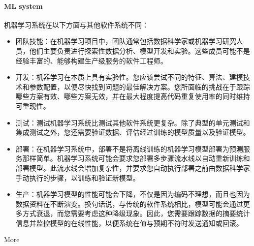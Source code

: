 \documentclass[letterpaper,11pt,english]{sphinxmanual}
\begin{document}
\paragraph{ML system}
\label{\detokenize{chapter_AI_dive/ML:ml-system}}
机器学习系统在以下方面与其他软件系统不同：%
\begin{footnote}[844]\sphinxAtStartFootnote
{}
%
\end{footnote}
\begin{itemize}
\item {} 
团队技能：在机器学习项目中，团队通常包括数据科学家或机器学习研究人员，他们主要负责进行探索性数据分析、模型开发和实验。这些成员可能不是经验丰富的、能够构建生产级服务的软件工程师。

\item {} 
开发：机器学习在本质上具有实验性。您应该尝试不同的特征、算法、建模技术和参数配置，以便尽快找到问题的最佳解决方案。您所面临的挑战在于跟踪哪些方案有效、哪些方案无效，并在最大程度提高代码重复使用率的同时维持可重现性。

\item {} 
测试：测试机器学习系统比测试其他软件系统更复杂。除了典型的单元测试和集成测试之外，您还需要验证数据、评估经过训练的模型质量以及验证模型。

\item {} 
部署：在机器学习系统中，部署不是将离线训练的机器学习模型部署为预测服务那样简单。机器学习系统可能会要求您部署多步骤流水线以自动重新训练和部署模型。此流水线会增加复杂性，并要求您自动执行部署之前由数据科学家手动执行的步骤，以训练和验证新模型。

\item {} 
生产：机器学习模型的性能可能会下降，不仅是因为编码不理想，而且也因为数据资料在不断演变。换句话说，与传统的软件系统相比，模型可能会通过更多方式衰退，而您需要考虑这种降级现象。因此，您需要跟踪数据的摘要统计信息并监控模型的在线性能，以便系统在值与预期不符时发送通知或回滚。

\end{itemize}

More%
\begin{footnote}[845]\sphinxAtStartFootnote
{}
%
\end{footnote}
\end{document}
